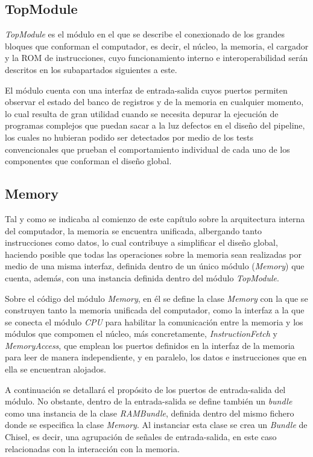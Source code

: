 \subsection{TopModule}

\textit{TopModule} es el módulo en el que se describe el conexionado de los grandes bloques que conforman el computador, es decir, el núcleo, la memoria, el cargador y la ROM de instrucciones, cuyo funcionamiento interno e interoperabilidad serán descritos en los subapartados siguientes a este.

El módulo cuenta con una interfaz de entrada-salida cuyos puertos permiten observar el estado del banco de registros y de la memoria en cualquier momento, lo cual resulta de gran utilidad cuando se necesita depurar la ejecución de programas complejos que puedan sacar a la luz defectos en el diseño del pipeline, los cuales no hubieran podido ser detectados por medio de los tests convencionales que prueban el comportamiento individual de cada uno de los componentes que conforman el diseño global.

\subsection{Memory}

Tal y como se indicaba al comienzo de este capítulo sobre la arquitectura interna del computador, la memoria se encuentra unificada, albergando tanto instrucciones como datos, lo cual contribuye a simplificar el diseño global, haciendo posible que todas las operaciones sobre la memoria sean realizadas por medio de una misma interfaz, definida dentro de un único módulo (\textit{Memory}) que cuenta, además, con una instancia definida dentro del módulo \textit{TopModule}.

Sobre el código del módulo \textit{Memory}, en él se define la clase \textit{Memory} con la que se construyen tanto la memoria unificada del computador, como la interfaz a la que se conecta el módulo \textit{CPU} para habilitar la comunicación entre la memoria y los módulos que compomen el núcleo, más concretamente, \textit{InstructionFetch} y \textit{MemoryAccess}, que emplean los puertos definidos en la interfaz de la memoria para leer de manera independiente, y en paralelo, los datos e instrucciones que en ella se encuentran alojados.

A continuación se detallará el propósito de los puertos de entrada-salida del módulo. No obstante, dentro de la entrada-salida se define también un \textit{bundle} como una instancia de la clase \textit{RAMBundle}, definida dentro del mismo fichero donde se especifica la clase \textit{Memory}. Al instanciar esta clase se crea un \textit{Bundle} de Chisel, es decir, una agrupación de señales de entrada-salida, en este caso relacionadas con la interacción con la memoria.

